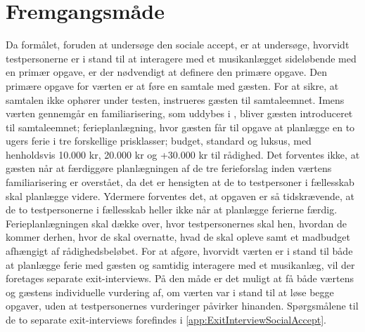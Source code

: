 \section{Fremgangsmåde}
\label{FremgangsmaadeSocialAccept}
%
Da formålet, foruden at undersøge den sociale accept, er at undersøge, hvorvidt testpersonerne er i stand til at interagere med et musikanlægget sideløbende med en primær opgave, er der nødvendigt at definere den primære opgave. Den primære opgave for værten er at føre en samtale med gæsten. For at sikre, at samtalen ikke ophører under testen, instrueres gæsten til samtaleemnet. Imens værten gennemgår en familiarisering, som uddybes i , bliver gæsten introduceret til samtaleemnet; ferieplanlægning, hvor gæsten får til opgave at planlægge en to ugers ferie i tre forskellige prisklasser; budget, standard og luksus, med henholdsvis 10.000 kr, 20.000 kr og +30.000 kr til rådighed. Det forventes ikke, at gæsten når at færdiggøre planlægningen af de tre ferieforslag inden værtens familiarisering er overstået, da det er hensigten at de to testpersoner i fællesskab skal planlægge videre. Ydermere forventes det, at opgaven er så tidskrævende, at de to testpersonerne i fællesskab heller ikke når at planlægge ferierne færdig. Ferieplanlægningen skal dække over, hvor testpersonernes skal hen, hvordan de kommer derhen, hvor de skal overnatte, hvad de skal opleve samt et madbudget afhængigt af rådighedsbeløbet. For at afgøre, hvorvidt værten er i stand til både at planlægge ferie med gæsten og samtidig interagere med et musikanlæg, vil der foretages separate exit-interviews. På den måde er det muligt at få både værtens og gæstens individuelle vurdering af, om værten var i stand til at løse begge opgaver, uden at testpersonernes vurderinger påvirker hinanden. Spørgsmålene til de to separate exit-interviews forefindes i \autoref{app:ExitInterviewSocialAccept}.\blankline
%

